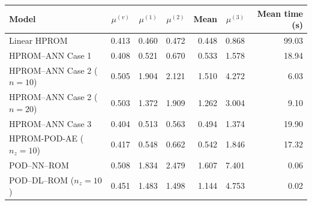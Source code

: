 \begin{tabular}{lrrrrrr}
\toprule
Model & $\mu^{(v)}$ & $\mu^{(1)}$ & $\mu^{(2)}$ & Mean & $\mu^{(3)}$ & Mean time (s) \\
\midrule
Linear HPROM & 0.413 & 0.460 & 0.472 & 0.448 & 0.868 & 99.03 \\
HPROM--ANN Case 1 & 0.408 & 0.521 & 0.670 & 0.533 & 1.578 & 18.94 \\
HPROM--ANN Case 2 ($n=10$) & 0.505 & 1.904 & 2.121 & 1.510 & 4.272 & 6.03 \\
HPROM--ANN Case 2 ($n=20$) & 0.503 & 1.372 & 1.909 & 1.262 & 3.004 & 9.10 \\
HPROM--ANN Case 3 & 0.404 & 0.513 & 0.563 & 0.494 & 1.374 & 19.90 \\
HPROM-POD-AE ($n_z=10$) & 0.417 & 0.548 & 0.662 & 0.542 & 1.846 & 17.32 \\
\midrule
POD--NN--ROM & 0.508 & 1.834 & 2.479 & 1.607 & 7.401 & 0.06 \\
POD--DL--ROM ($n_z=10$) & 0.451 & 1.483 & 1.498 & 1.144 & 4.753 & 0.02 \\
\bottomrule
\end{tabular}
